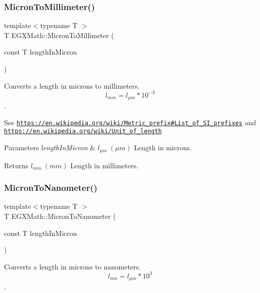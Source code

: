 \subsubsection{\texorpdfstring{Micron\+To\+Millimeter()}{MicronToMillimeter()}}
{\footnotesize\ttfamily template$<$typename T $>$ \\
T E\+G\+X\+Math\+::\+Micron\+To\+Millimeter (\begin{DoxyParamCaption}\item[{const T}]{length\+In\+Micron }\end{DoxyParamCaption})}



Converts a length in microns to millimeters. \[ l_{mm}=l_{\mu m} * 10^{-3} \]. 

See \href{https://en.wikipedia.org/wiki/Metric_prefix#List_of_SI_prefixes}{\tt https\+://en.\+wikipedia.\+org/wiki/\+Metric\+\_\+prefix\#\+List\+\_\+of\+\_\+\+S\+I\+\_\+prefixes} and \href{https://en.wikipedia.org/wiki/Unit_of_length}{\tt https\+://en.\+wikipedia.\+org/wiki/\+Unit\+\_\+of\+\_\+length} 
\begin{DoxyParams}{Parameters}
{\em length\+In\+Micron} & $ l_{\mu m}\ (\mu m)$ Length in microns. \\
\hline
\end{DoxyParams}
\begin{DoxyReturn}{Returns}
$ l_{mm}\ (mm)$ Length in millimeters. 
\end{DoxyReturn}
\mbox{\label{group___e_g_x_math-_conversions-_length_conversions-_non-_s_i-_micron-_s_i_ga6006dadf7b1a114319bf3b5768f7ef90}} 
\subsubsection{\texorpdfstring{Micron\+To\+Nanometer()}{MicronToNanometer()}}
{\footnotesize\ttfamily template$<$typename T $>$ \\
T E\+G\+X\+Math\+::\+Micron\+To\+Nanometer (\begin{DoxyParamCaption}\item[{const T}]{length\+In\+Micron }\end{DoxyParamCaption})}



Converts a length in microns to nanometers. \[ l_{nm}=l_{\mu m} * 10^{3} \]. 

